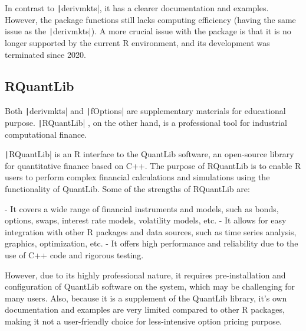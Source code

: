 In contrast to \texttt|derivmkts|, it has a clearer documentation and examples. However, the package functions still lacks computing efficiency (having the same issue as the \texttt|derivmkts|). A more crucial issue with the package is that it is no longer supported by the current R environment, and its development was terminated since 2020.

\subsection{RQuantLib} \label{sub:RQuantLib}

Both \texttt|derivmkts| and \texttt|fOptions| are supplementary materials for educational purpose. \texttt|RQuantLib| \cite{Eddel2022}, on the other hand, is a professional tool for industrial computational finance.

\texttt|RQuantLib| is an R interface to the QuantLib software, an open-source library for quantitative finance based on C++. The purpose of RQuantLib is to enable R users to perform complex financial calculations and simulations using the functionality of QuantLib. Some of the strengths of RQuantLib are:

- It covers a wide range of financial instruments and models, such as bonds, options, swaps, interest rate models, volatility models, etc.
- It allows for easy integration with other R packages and data sources, such as time series analysis, graphics, optimization, etc.
- It offers high performance and reliability due to the use of C++ code and rigorous testing.

However, due to its highly professional nature, it requires pre-installation and configuration of QuantLib software on the system, which may be challenging for many users. Also, because it is a supplement of the QuantLib library, it's own documentation and examples are very limited compared to other R packages, making it not a user-friendly choice for less-intensive option pricing purpose.

\newpage
